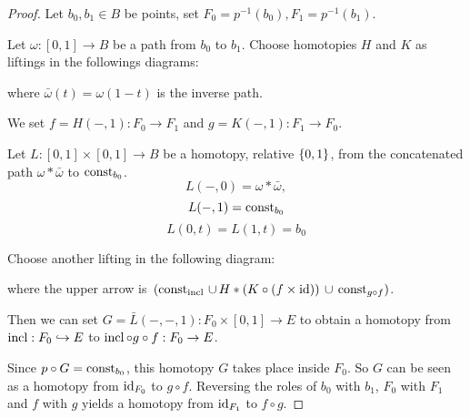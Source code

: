 \begin{proof}
Let $b_0,b_1\in B$ be points, set $F_0=p^{-1}(b_0),F_1=p^{-1}(b_1)$.

Let $\omega:[0,1]\to B$ be a path from $b_0$ to $b_1$. Choose homotopies $H$ and $K$ as liftings in the followings diagrams:
\begin{center}
\qquad
{}
\end{center}

where $\bar\omega(t)=\omega(1-t)$ is the inverse path.

We set $f=H(-,1):F_0\to F_1$ and $g=K(-,1):F_1\to F_0$.

Let $L:[0,1]\times[0,1]\to B$ be a homotopy, relative $\{0,1\}$, from the concatenated path $\omega*\bar\omega$ to $\operatorname{const}_{b_0}$.
\[L(-,0)=\omega*\bar\omega,\]
\[L(-,1)=\operatorname{const}_{b_0}\]
\[L(0,t)=L(1,t)=b_0\]

Choose another lifting in the following diagram:

\begin{center}
\end{center}
where the upper arrow is\alvaropls\ $(\operatorname{const}_{\operatorname{incl}}\,\cup\, H*(K\circ(f\times\operatorname{id}))\,\cup\,\operatorname{const}_{g\circ f})$.\smallskip



\vspace{-0.1cm}
Then we can set $G=\bar L(-,-,1):F_0\times[0,1]\to E$ to obtain a homotopy from $\operatorname{incl}:F_0\hookrightarrow E$ to $\operatorname{incl}\circ g\circ f:F_0\to E$.

Since $p\circ G=\operatorname{const}_{b_0}$, this homotopy $G$ takes place inside $F_0$. So $G$ can be seen as a homotopy from $\operatorname{id}_{F_0}$ to $g\circ f$. Reversing the roles of $b_0$ with $b_1$, $F_0$ with $F_1$ and $f$ with $g$ yields a homotopy from $\operatorname{id}_{F_1}$ to $f\circ g$.
\end{proof}

